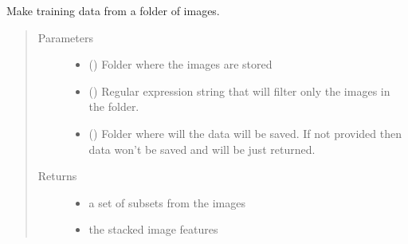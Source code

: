 \documentclass[letterpaper,10pt,english]{sphinxmanual}
\begin{document}
\begin{fulllineitems}
\label{\detokenize{api:readpyne.model.make_training_data}}
Make training data from a folder of images.
\begin{quote}\begin{description}
\item[{Parameters}] \leavevmode\begin{itemize}
\item {} 
 () \textendash{} Folder where the images are stored

\item {} 
 () \textendash{} Regular expression string that will filter only the images
in the folder.

\item {} 
 () \textendash{} Folder where will the data will be saved. If not provided then
data won’t be saved and will be just returned.

\end{itemize}

\item[{Returns}] \leavevmode
\begin{itemize}
\item {} 
 \textendash{} a set of subsets from the images

\item {} 
 \textendash{} the stacked image features

\end{itemize}


\end{description}\end{quote}

\end{fulllineitems}

\end{document}
